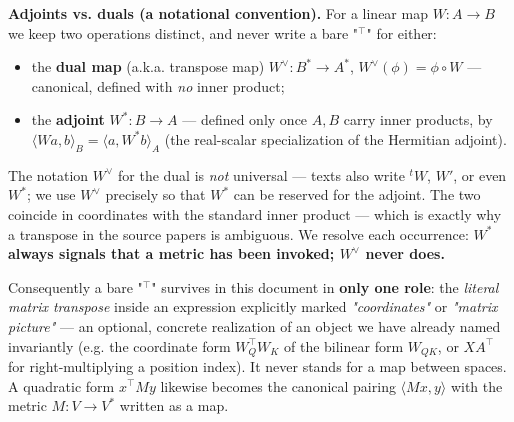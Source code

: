\begin{callout}
\textbf{Adjoints vs. duals (a notational convention).} For a linear map $W:A\to B$ we keep two operations distinct, and never write a bare "$^\top$" for either:

\begin{itemize}
\item the \textbf{dual map} (a.k.a. transpose map) $W^{\vee}:B^{*}\to A^{*}$, $W^{\vee}(\phi) = \phi\circ W$ --- canonical, defined with \emph{no} inner product;
\item the \textbf{adjoint} $W^{*}:B\to A$ --- defined only once $A,B$ carry inner products, by $\langle Wa, b\rangle_B = \langle a, W^{*}b\rangle_A$ (the real-scalar specialization of the Hermitian adjoint).
\end{itemize}

The notation $W^{\vee}$ for the dual is \emph{not} universal --- texts also write ${}^{t}W$, $W'$, or even $W^{*}$; we use $W^{\vee}$ precisely so that $W^{*}$ can be reserved for the adjoint. The two coincide in coordinates with the standard inner product --- which is exactly why a transpose in the source papers is ambiguous. We resolve each occurrence: \textbf{$W^{*}$ always signals that a metric has been invoked; $W^{\vee}$ never does.}


Consequently a bare "$^{\top}$" survives in this document in \textbf{only one role}: the \emph{literal matrix transpose} inside an expression explicitly marked \emph{"coordinates"} or \emph{"matrix picture"} --- an optional, concrete realization of an object we have already named invariantly (e.g. the coordinate form $W_Q^{\top}W_K$ of the bilinear form $W_{QK}$, or $X A^{\top}$ for right-multiplying a position index). It never stands for a map between spaces. A quadratic form $x^{\top}M y$ likewise becomes the canonical pairing $\langle Mx, y\rangle$ with the metric $M:V\to V^{*}$ written as a map.

\end{callout}


